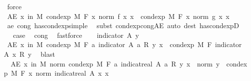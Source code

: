 \begin{isabellebody}
\ force\isanewline
\ \ \isamarkupfalse%
\ \isamarkupfalse%
\ {\isachardoublequoteopen}AE\ x\ in\ M{\isachardot}{\kern0pt}\ cond{\isacharunderscore}{\kern0pt}exp\ M\ F\ {\isacharparenleft}{\kern0pt}{\isasymlambda}x{\isachardot}{\kern0pt}\ norm\ {\isacharparenleft}{\kern0pt}f\ x{\isacharparenright}{\kern0pt}{\isacharparenright}{\kern0pt}\ x\ {\isacharequal}{\kern0pt}\ cond{\isacharunderscore}{\kern0pt}exp\ M\ F\ {\isacharparenleft}{\kern0pt}{\isasymlambda}x{\isachardot}{\kern0pt}\ norm\ {\isacharparenleft}{\kern0pt}g\ x{\isacharparenright}{\kern0pt}{\isacharparenright}{\kern0pt}\ x{\isachardoublequoteclose}\ \ \isamarkupfalse%
\ ae\ cong\ has{\isacharunderscore}{\kern0pt}cond{\isacharunderscore}{\kern0pt}exp{\isacharunderscore}{\kern0pt}simple\ \isamarkupfalse%
\ {\isacharparenleft}{\kern0pt}subst\ cond{\isacharunderscore}{\kern0pt}exp{\isacharunderscore}{\kern0pt}cong{\isacharunderscore}{\kern0pt}AE{\isacharparenright}{\kern0pt}\ {\isacharparenleft}{\kern0pt}auto\ dest{\isacharcolon}{\kern0pt}\ has{\isacharunderscore}{\kern0pt}cond{\isacharunderscore}{\kern0pt}expD{\isacharparenright}{\kern0pt}\isanewline
\ \ \isamarkupfalse%
\ \isamarkupfalse%
\ {\isacharquery}{\kern0pt}case\ \isamarkupfalse%
\ cong{\isacharparenleft}{\kern0pt}{}{\isacharparenright}{\kern0pt}\ \isamarkupfalse%
\ fastforce\isanewline
{}\isamarkupfalse%
\isanewline
\ \ \isamarkupfalse%
\ {\isacharparenleft}{\kern0pt}indicator\ A\ y{\isacharparenright}{\kern0pt}\isanewline
\ \ \isamarkupfalse%
\ {\isachardoublequoteopen}AE\ x\ in\ M{\isachardot}{\kern0pt}\ cond{\isacharunderscore}{\kern0pt}exp\ M\ F\ {\isacharparenleft}{\kern0pt}{\isasymlambda}a{\isachardot}{\kern0pt}\ indicator\ A\ a\ {\isacharasterisk}{\kern0pt}\isactrlsub R\ y{\isacharparenright}{\kern0pt}\ x\ {\isacharequal}{\kern0pt}\ cond{\isacharunderscore}{\kern0pt}exp\ M\ F\ {\isacharparenleft}{\kern0pt}indicator\ A{\isacharparenright}{\kern0pt}\ x\ {\isacharasterisk}{\kern0pt}\isactrlsub R\ y{\isachardoublequoteclose}\ \isamarkupfalse%
\ blast\isanewline
\ \ \isamarkupfalse%
\ {\isacharasterisk}{\kern0pt}{\isacharcolon}{\kern0pt}\ {\isachardoublequoteopen}AE\ x\ in\ M{\isachardot}{\kern0pt}\ norm\ {\isacharparenleft}{\kern0pt}cond{\isacharunderscore}{\kern0pt}exp\ M\ F\ {\isacharparenleft}{\kern0pt}{\isasymlambda}a{\isachardot}{\kern0pt}\ indicat{\isacharunderscore}{\kern0pt}real\ A\ a\ {\isacharasterisk}{\kern0pt}\isactrlsub R\ y{\isacharparenright}{\kern0pt}\ x{\isacharparenright}{\kern0pt}\ {\isasymle}\ norm\ y\ {\isacharasterisk}{\kern0pt}\ cond{\isacharunderscore}{\kern0pt}exp\ M\ F\ {\isacharparenleft}{\kern0pt}{\isasymlambda}x{\isachardot}{\kern0pt}\ norm\ {\isacharparenleft}{\kern0pt}indicat{\isacharunderscore}{\kern0pt}real\ A\ x{\isacharparenright}{\kern0pt}{\isacharparenright}{\kern0pt}\ x{\isachardoublequoteclose}\ \isamarkupfalse%

\end{isabellebody}
